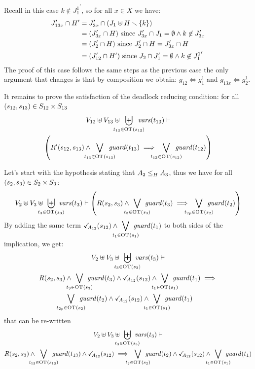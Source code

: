 \documentclass[runningheads]{llncs}
\begin{document}
Recall in this case  $k \notin {J^1_{1}}^{\prime}$, so for all $x \in X$ we have:
\begin{align*}
	J'_{13x} \cap H' & = J'_{3x}  \cap \mpar{J_1 \uplus H \setminus \mbrc{k}} \\
& = \mpar{J'_{3x}\cap H } \text{ since } J'_{3x}\cap J_1=\emptyset \land k\not\in J'_{3x} \\
& = \mpar{J'_2\cap H } \text{ since } J'_2 \cap H = J'_{3x} \cap H\\
& = \mpar{J'_{12}\cap H' } \text{ since } J_2\cap J'_1=\emptyset \land k\not\in {J^1_{1}}^{\prime}
\end{align*}
The proof of this case follows the same steps as the previous case the only argument that changes is that by composition we obtain:  $g_{12} \Leftrightarrow g^1_1$ and
$g_{13x}  \Leftrightarrow g^1_{2}$.

\item It remains to prove the  satisfaction of the  deadlock reducing condition:  for all $\mpar{s_{12}, s_{13}} \in S_{12} \times S_{13}$
\begin{multline*}
V_{12} \uplus V_{13} \uplus \biguplus_\subbox{t_{13}\in \fOT{s_{13}}} \fvars{t_{13}} \vdash \\ \left(R^{\prime}\mpar{s_{12}, s_{13}} \wedge \bigvee_\subbox{t_{13} \in \fOT{s_{13}}} \fguard{t_{13}} \implies \bigvee_\subbox{t_{12} \in \fOT{s_{12}}} \fguard{t_{12}} \right)
\end{multline*}


Let's start with the hypothesis  stating that $\wrel{A_2}{A_3}{H}$, thus we have for all $\mpar{s_{2}, s_3} \in S_2 \times S_3$:
\begin{multline*}
 V_2 \uplus V_3 \uplus \biguplus_\subbox{t_3 \in \fOT{s_3}} \fvars{t_3} \vdash \left(R\mpar{s_{2}, s_3} \wedge \bigvee_\subbox{t_3 \in \fOT{s_3}} \fguard{t_3} \implies \bigvee_\subbox{t_{2p} \in \fOT{s_{2}}} \fguard{t_{2}} \right)
\end{multline*}
By adding the same term ${\displaystyle \reach{A_{12}}\mpar{s_{12}} \wedge \bigvee_\subbox{t_1 \in \fOT{s_1}} \fguard{t_1}}$ to both sides of the implication, we get:
\begin{multline*}
 V_2 \uplus V_3 \uplus \biguplus_\subbox{t_3 \in \fOT{s_3}} \fvars{t_3} \vdash\\ R\mpar{s_{2}, s_3} \wedge \bigvee_\subbox{t_3 \in \fOT{s_3}} \fguard{t_3} \wedge \reach{A_{12}}\mpar{s_{12}} \wedge \bigvee_\subbox{t_1 \in \fOT{s_1}} \fguard{t_1} \implies\\ \bigvee_\subbox{t_{2p} \in \fOT{s_{2}}} \fguard{t_{2}} \wedge \reach{A_{12}}\mpar{s_{12}} \wedge \bigvee_\subbox{t_1 \in \fOT{s_1}} \fguard{t_1}
\end{multline*}
that can be re-written
\begin{multline*}
 V_2 \uplus V_3 \uplus \biguplus_\subbox{t_3 \in \fOT{s_3}} \fvars{t_3} \vdash\\ R\mpar{s_{2}, s_3} \wedge \bigvee_\subbox{t_{13} \in \fOT{s_{13}}} \fguard{t_{13}} \wedge \reach{A_{12}}\mpar{s_{12}}  \implies \bigvee_\subbox{t_{2} \in \fOT{s_{2}}} \fguard{t_{2}} \wedge \reach{A_{12}}\mpar{s_{12}} \wedge \bigvee_\subbox{t_1 \in \fOT{s_1}} \fguard{t_1}
\end{multline*}
\end{document}
